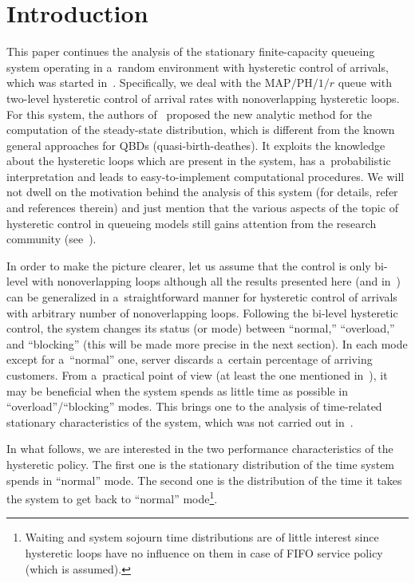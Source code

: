       \begin{multicols}{2}

                  \label{st\stat}


\section{Introduction}

\noindent
This paper continues the analysis 
of the stationary finite-capacity queueing system 
operating in a~random environment
with hysteretic control of arrivals, 
which was started in~\cite{int0}.
Specifically, we deal with the $\mathrm{MAP}/\mathrm{PH}/1/r$ queue 
with two-level hysteretic control of 
arrival rates with nonoverlapping hysteretic
loops. For this system, the authors 
of~\cite{int0} proposed the 
new analytic method for the computation 
of the steady-state distribution, which
is different from the known general approaches 
for QBDs (quasi-birth-deathes). It exploits the knowledge about the hysteretic loops 
which are present in the system, has a~probabilistic interpretation
and leads to easy-to-implement computational procedures.  
We will not dwell on the motivation behind the 
analysis of this system (for details, refer~\cite{int0} and references therein)
and just mention that the various aspects of the 
topic of hysteretic control in 
queueing models still gains attention from the research 
community (see~\cite{int2, int3, int4}).

In order to make the picture clearer, let us assume 
that the control is only bi-level with nonoverlapping 
loops although all the results 
presented here (and in~\cite{int0}) can be 
generalized in a~straightforward manner for 
hysteretic control of arrivals with arbitrary number of 
nonoverlapping loops. 
Following the bi-level hysteretic control, 
the system changes its status (or mode) 
between ``normal,'' ``overload,'' and ``blocking'' 
(this will be made more precise in the next section). In each mode 
except for a~``normal'' one, server discards a~certain percentage 
of arriving customers. From a~practical point of view 
(at least the one mentioned in~\cite{int1}), 
it may be beneficial when the system spends 
as little time as possible in ``overload''/``blocking'' 
modes. This brings one to the analysis of time-related stationary
characteristics of the system, which was not carried out in~\cite{int0}.

In what follows, we are interested in the two performance characteristics 
of the hysteretic policy. The first one is the stationary
distribution of the time system spends in ``normal'' mode. 
The second one is the distribution of the time it takes the system to get back 
to ``normal'' mode\footnote[3]{Waiting and system sojourn time distributions
are of little interest since hysteretic loops have no influence on them in 
case of FIFO service policy (which is assumed).}. 


\end{multicols}
